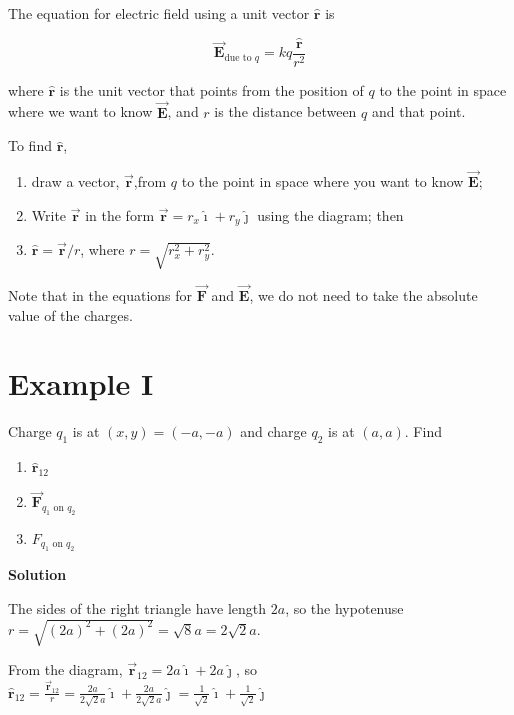 \documentclass{article}
\newcommand{\ds}[0]{\displaystyle}
\newcommand{\ihat}[0]{\hat{\boldsymbol{\imath}}}
\newcommand{\jhat}[0]{\hat{\boldsymbol{\jmath}}}
\newcommand{\rhat}[0]{\hat{\mathbf{r}}}
\newcommand{\bfvec}[1]{\vec{\mathbf{#1}}}
\begin{document}
The equation for electric field using a unit vector $\rhat$ is

$$\bfvec{E}_{\text{due to }q}=kq\frac{\rhat}{r^2}$$

where $\rhat$ is the unit vector that points from the position of $q$ to the point in space where we want to know $\bfvec{E}$, and $r$ is the distance between $q$ and that point. 

To find $\rhat$, 

\begin{enumerate}

  \item draw a vector, $\bfvec{r}$,from $q$ to the point in space where you want to know $\bfvec{E}$;

  \item Write $\bfvec{r}$ in the form $\bfvec{r}=r_x\ihat+r_y\jhat$ using the diagram; then

  \item $\rhat=\bfvec{r}/r$, where $r=\sqrt{r_x^2+r_y^2}$.

\end{enumerate}

Note that in the equations for $\bfvec{F}$ and $\bfvec{E}$, we do not need to take the absolute value of the charges.

\newpage

\section{Example I}

Charge $q_1$ is at $(x,y)=(-a,-a)$ and charge $q_2$ is at $(a, a)$. Find

\begin{enumerate}

  \item $\rhat_{12}$

  \item $\bfvec{F}_{q_1\text{ on }q_2}$

  \item $F_{q_1\text{ on }q_2}$

\end{enumerate}

\textbf{Solution}



The sides of the right triangle have length $2a$, so the hypotenuse $r=\sqrt{(2a)^2+(2a)^2}=\sqrt{8}a=2\sqrt{2}a$. 

From the diagram, $\bfvec{r}_{12}=2a\ihat + 2a\jhat$, so $\ds\rhat_{12}=\frac{\bfvec{r}_{12}}{r}=\frac{2a}{2\sqrt{2}a}\ihat + \frac{2a}{2\sqrt{2}a}\jhat=\frac{1}{\sqrt{2}}\ihat + \frac{1}{\sqrt{2}}\jhat$
\end{document}
